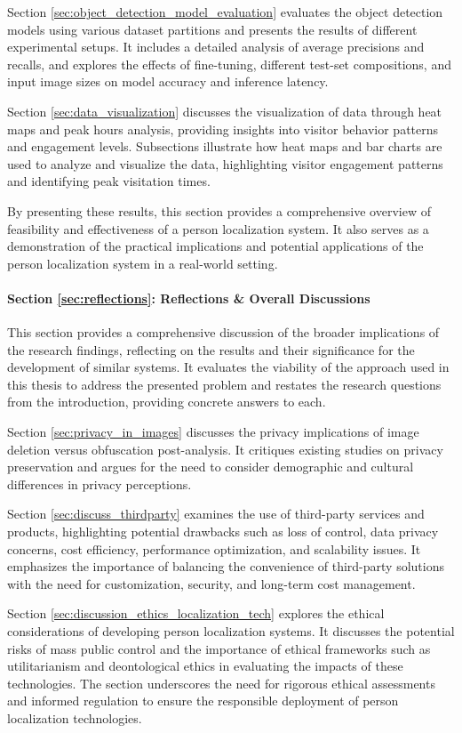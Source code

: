 Section \ref{sec:object_detection_model_evaluation} evaluates the object detection models using various dataset partitions and presents the results of different experimental setups. It includes a detailed analysis of average precisions and recalls, and explores the effects of fine-tuning, different test-set compositions, and input image sizes on model accuracy and inference latency.

Section \ref{sec:data_visualization} discusses the visualization of data through heat maps and peak hours analysis, providing insights into visitor behavior patterns and engagement levels. Subsections illustrate how heat maps and bar charts are used to analyze and visualize the data, highlighting visitor engagement patterns and identifying peak visitation times.

By presenting these results, this section provides a comprehensive overview of feasibility and effectiveness of a person localization system. It also serves as a demonstration of the practical implications and potential applications of the person localization system in a real-world setting.


\paragraph{Section \ref{sec:reflections}: Reflections \& Overall Discussions} 
This section provides a comprehensive discussion of the broader implications of the research findings, reflecting on the results and their significance for the development of similar systems. It evaluates the viability of the approach used in this thesis to address the presented problem and restates the research questions from the introduction, providing concrete answers to each.

Section \ref{sec:privacy_in_images} discusses the privacy implications of image deletion versus obfuscation post-analysis. It critiques existing studies on privacy preservation and argues for the need to consider demographic and cultural differences in privacy perceptions.

Section \ref{sec:discuss_thirdparty} examines the use of third-party services and products, highlighting potential drawbacks such as loss of control, data privacy concerns, cost efficiency, performance optimization, and scalability issues. It emphasizes the importance of balancing the convenience of third-party solutions with the need for customization, security, and long-term cost management.

Section \ref{sec:discussion_ethics_localization_tech} explores the ethical considerations of developing person localization systems. It discusses the potential risks of mass public control and the importance of ethical frameworks such as utilitarianism and deontological ethics in evaluating the impacts of these technologies. The section underscores the need for rigorous ethical assessments and informed regulation to ensure the responsible deployment of person localization technologies.

